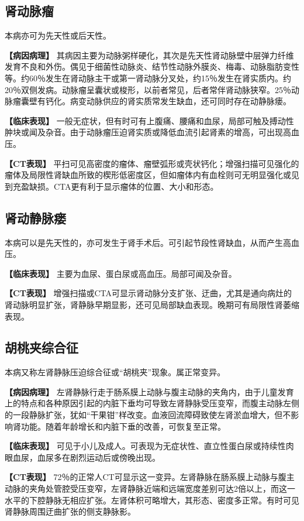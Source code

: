\subsection{肾动脉瘤}

本病亦可为先天性或后天性。

\textbf{【病因病理】}
其病因主要为动脉粥样硬化，其次是先天性肾动脉壁中层弹力纤维发育不良和外伤。偶见于细菌性动脉炎、结节性动脉外膜炎、梅毒、动脉脂肪变性等。约60％发生在肾动脉主干或第一肾动脉分叉处，约15％发生在肾实质内。约20％双侧发病。动脉瘤呈囊状或梭形，以前者常见，后者常伴肾动脉狭窄。25％动脉瘤囊壁有钙化。病变动脉供应的肾实质常发生缺血，还可同时存在动静脉瘘。

\textbf{【临床表现】}
一般无症状，但有时可有上腹痛、腰痛和血尿，局部可触及搏动性肿块或闻及杂音。由于动脉瘤压迫肾实质或降低血流引起肾素的增高，可出现高血压。

\textbf{【CT表现】}
平扫可见高密度的瘤体、瘤壁弧形或壳状钙化；增强扫描可见强化的瘤体及局限性肾缺血所致的楔形低密度区，但如瘤体内有血栓则可无明显强化或见到充盈缺损。CTA更有利于显示瘤体的位置、大小和形态。

\subsection{肾动静脉瘘}

本病可以是先天性的，亦可发生于肾手术后。可引起节段性肾缺血，从而产生高血压。

\textbf{【临床表现】} 主要为血尿、蛋白尿或高血压。局部可闻及杂音。

\textbf{【CT表现】}
增强扫描或CTA可显示肾动脉分支扩张、迂曲，尤其是通向病灶的肾动脉明显扩张，肾静脉早期显影，还可见局部缺血表现。晚期可有局限性肾萎缩表现。

\subsection{胡桃夹综合征}

本病又称左肾静脉压迫综合征或“胡桃夹”现象。属正常变异。

\textbf{【病因病理】}
左肾静脉行走于肠系膜上动脉与腹主动脉的夹角内，由于儿童发育上的特点和各种原因引起的内脏下垂均可导致左肾静脉受压变窄，而腹主动脉左侧的一段静脉扩张，犹如“干果钳”样改变。血液回流障碍致使左肾淤血增大，但不影响肾功能。随着年龄增长和内脏下垂的改善，可恢复至正常。

\textbf{【临床表现】}
可见于小儿及成人。可表现为无症状性、直立性蛋白尿或持续性肉眼血尿，血尿多在剧烈运动后或傍晚出现。

\textbf{【CT表现】}
72％的正常人CT可显示这一变异。左肾静脉在肠系膜上动脉与腹主动脉的夹角处管腔受压变窄，左肾静脉近端和远端宽度差别可达2倍以上，而这一水平的下腔静脉无相应扩张。左肾体积可略增大，其形态、密度多正常。有时可见肾静脉周围迂曲扩张的侧支静脉影。

